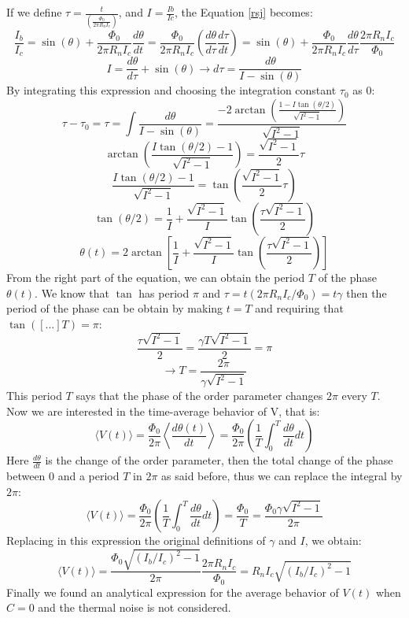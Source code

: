 \documentclass[12pt]{article}
\begin{document}
If we define $\tau = \frac{t}{\left(\frac{\Phi_{0}}{2\pi R_{n}I_{c}}\right)}$, and $I = \frac{Ib}{Ic}$, the Equation \ref{rsj} becomes:
$$
	\frac{I_{b}}{I_{c}} = \sin(\theta) + \frac{\Phi_{0}}{2\pi R_{n} I_{c}}\frac{d\theta}{dt} = \frac{\Phi_{0}}{2\pi R_{n} I_{c}}\left(\frac{d\theta}{d\tau} \frac{d\tau}{dt}\right) = \sin(\theta) + \frac{\Phi_{0}}{2\pi R_{n} I_{c}}\frac{d\theta}{d\tau} \frac{2\pi R_{n} I_{c}}{\Phi_{0}}
$$
$$
	I = \frac{d\theta}{d\tau} + \sin(\theta) \longrightarrow d\tau = \frac{d\theta}{I-\sin(\theta)}
$$
By integrating this expression and choosing the integration constant $\tau_{0}$ as $0$:
$$
\tau - \tau_{0} = \tau = \int \frac{d\theta}{I-\sin(\theta)} = \frac{-2\arctan\left(\frac{1-I\tan(\theta/2)}{\sqrt{I^{2}-1}}\right)}{\sqrt{I^{2}-1}}
$$
$$
\arctan\left(\frac{I\tan(\theta/2)-1}{\sqrt{I^{2}-1}}\right)=\frac{\sqrt{I^{2}-1}}{2} \tau
$$
$$
\frac{I\tan(\theta/2)-1}{\sqrt{I^{2}-1}} = \tan\left(\frac{\sqrt{I^{2}-1}}{2}\tau\right)
$$
$$
\tan(\theta/2) = \frac{1}{I} + \frac{\sqrt{I^{2}-1}}{I}\tan\left(\frac{\tau \sqrt{I^{2}-1}}{2}\right)
$$
$$
\theta(t) = 2\arctan\left[\frac{1}{I} + \frac{\sqrt{I^{2}-1}}{I} \tan\left(\frac{\tau \sqrt{I^{2}-1}}{2}\right) \right]
$$
From the right part of the equation, we can obtain the period $T$ of the phase $\theta(t)$. We know that $\tan$ has period $\pi$ and $\tau = t(2\pi R_{n}I_{c}/\Phi_{0}) = t\gamma$ then the period of the phase can be obtain by making $t=T$ and requiring that $\tan([...]T) = \pi$:
$$
\frac{\tau\sqrt{I^{2}-1}}{2} = \frac{\gamma T \sqrt{I^{2}-1}}{2} = \pi
$$
$$
\rightarrow T = \frac{2\pi}{\gamma \sqrt{I^{2}-1}}
$$  
This period $T$ says that the phase of the order parameter changes $2\pi$ every $T$. Now we are interested in the time-average behavior of V, that is:
$$
\langle V(t)\rangle = \frac{\Phi_{0}}{2\pi}\left\langle\frac{d\theta(t)}{dt}\right\rangle = \frac{\Phi_{0}}{2\pi}\left(\frac{1}{T}\int_{0}^{T}\frac{d\theta}{dt} dt\right)
$$
Here $\frac{d\theta}{dt}$ is the change of the order parameter, then the total change of the phase between 0 and a period $T$ in $2\pi$ as said before, thus we can replace the integral by $2\pi$:
$$
\langle V(t)\rangle = \frac{\Phi_{0}}{2\pi}\left(\frac{1}{T}\int_{0}^{T}\frac{d\theta}{dt} dt\right) = \frac{\Phi_{0}}{T} = \frac{\Phi_{0}\gamma \sqrt{I^{2}-1}}{2\pi} 
$$
Replacing in this expression the original definitions of $\gamma$ and $I$, we obtain:
$$
\langle V(t)\rangle = \frac{\Phi_{0}\sqrt{(I_{b}/I_{c})^{2}-1}}{2\pi} \frac{2\pi R_{n}I_{c}}{\Phi_{0}}  = R_{n}I_{c} \sqrt{(I_{b}/I_{c})^{2}-1} 
$$ 
Finally we found an analytical expression for the average behavior of $V(t)$ when $C=0$ and the thermal noise is not considered. 
\end{document}
